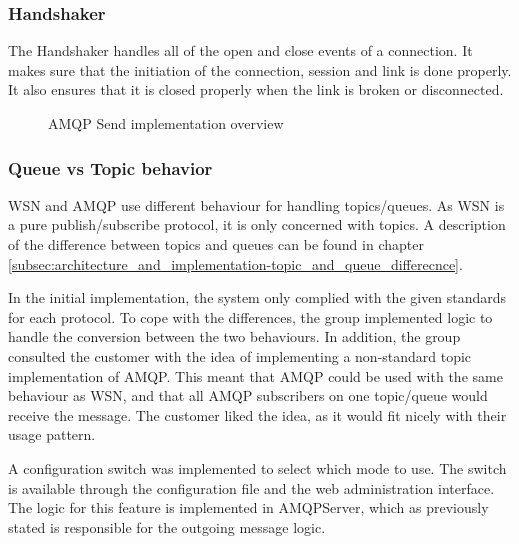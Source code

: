 \subsubsection{Handshaker}
The Handshaker handles all of the open and close events of a connection. It makes sure that the initiation of the connection, session and link is done properly. It also ensures that it is closed properly when the link is broken or disconnected.

\begin{center}
  \begin{figure}[ht!]
    \caption{AMQP Send implementation overview}
    \label{fig:amqp_send}
  \end{figure}
\end{center}

\subsubsection{Queue vs Topic behavior}
WSN and AMQP use different behaviour for handling topics/queues. As WSN is a pure publish/subscribe protocol, it is only concerned with topics. A description of the difference between topics and queues can be found in chapter \ref{subsec:architecture_and_implementation-topic_and_queue_differecnce}.

In the initial implementation, the system only complied with the given standards for each protocol. To cope with the differences, the group implemented logic to handle the conversion between the two behaviours. In addition, the group consulted the customer with the idea of implementing a non-standard topic implementation of AMQP. This meant that AMQP could be used with the same behaviour as WSN, and that all AMQP subscribers on one topic/queue would receive the message. The customer liked the idea, as it would fit nicely with their usage pattern. 

A configuration switch was implemented to select which mode to use. The switch is available through the configuration file and the web administration interface. The logic for this feature is implemented in AMQPServer, which as previously stated is responsible for the outgoing message logic.


\clearpage
